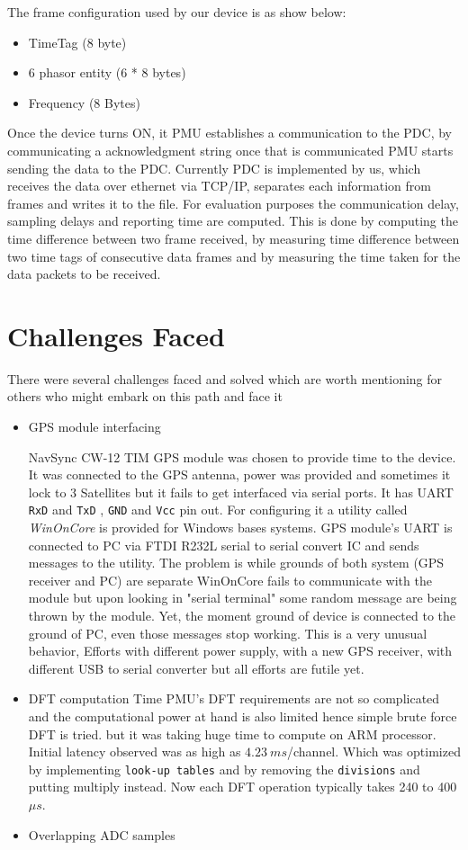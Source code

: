 The frame configuration used by our device is as show below:
\begin{itemize}
	\item TimeTag (8 byte)
	\item 6 phasor entity (6 * 8 bytes)
	\item Frequency (8 Bytes)
\end{itemize}
Once the device turns ON, it PMU establishes a communication to the PDC, by communicating a acknowledgment string once that is communicated PMU starts sending the data to the PDC. Currently PDC is implemented by us, which receives the data over ethernet via TCP/IP, separates each information from frames and writes it to the file. For evaluation purposes the communication delay, sampling delays and reporting time are computed. This is done by computing the time difference between two frame received, by measuring time difference between two time tags of consecutive data frames and by measuring the time taken for the data packets to be received. 

\section{Challenges Faced}
There were several challenges faced and solved which are worth mentioning for others who might embark on this path and face it

\begin{itemize}
	\item GPS module interfacing
	
	NavSync CW-12 TIM GPS module was chosen to provide time to the device. It was connected to the GPS antenna, power was provided and sometimes it lock to 3 Satellites but it fails to get interfaced via serial ports. It has UART \texttt{RxD} and \texttt{TxD} , \texttt{GND} and \texttt{Vcc} pin out.  For configuring it a utility called \textit{WinOnCore} is provided for Windows bases systems. GPS module's UART is connected to PC via FTDI R232L serial to serial convert IC and sends messages to the utility. The problem is while grounds of both system (GPS receiver and PC) are separate WinOnCore fails to communicate with the module but upon looking in "serial terminal" some random message are being thrown by the module. Yet, the moment ground of device is connected to the ground of PC, even those messages stop working. This is a very unusual behavior, Efforts with different power supply, with a new GPS receiver, with different USB to serial converter but all efforts are futile yet.
	
	\item DFT computation Time 
	PMU's DFT requirements are not so complicated and the computational power at hand is also limited hence simple brute force DFT is tried. but it was taking huge time to compute on ARM processor. Initial latency observed was as high as $4.23 ~ms$/channel. Which was optimized by implementing \texttt{look-up tables} and by removing the \texttt{divisions} and putting multiply instead. Now each DFT operation typically  takes 240 to 400 $\mu s$. 
	
	\item Overlapping ADC samples 
	

\end{itemize}